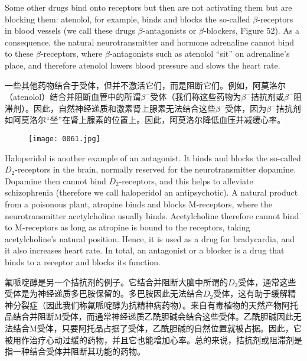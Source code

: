 \documentclass[dvipsnames, svgnames,a4paper,11pt]{article}
\begin{document}
Some other drugs bind onto receptors but then are not activating them but are blocking them: atenolol, for example, binds and blocks the so-called $\beta$-receptors in blood vessels (we call these drugs $\beta$-antagonists or $\beta$-blockers, Figure 52). As a consequence, the natural neurotransmitter and hormone adrenaline cannot bind to these $\beta$-receptors, where $\beta$-antagonists such as atenolol “sit” on adrenaline’s place, and therefore atenolol lowers blood pressure and slows the heart rate.  

一些其他药物结合于受体，但并不激活它们，而是阻断它们。例如，阿莫洛尔（atenolol）结合并阻断血管中的所谓$\beta^{-}$受体（我们称这些药物为$\beta^{-}$拮抗剂或$\beta^{-}$阻滞剂）。因此，自然神经递质和激素肾上腺素无法结合这些$\beta^{-}$受体，因为$\beta^{-}$拮抗剂如阿莫洛尔“坐”在肾上腺素的位置上。因此，阿莫洛尔降低血压并减缓心率。

\begin{figure}[ht]
    \centering
    \texttt{[image: 0061.jpg]}
     \label{fig52B}
\end{figure}

Haloperidol is another example of an antagonist. It binds and blocks the so-called $D_2$-receptors in the brain, normally reserved for the neurotransmitter dopamine. Dopamine then cannot bind $D_2$-receptors, and this helps to alleviate schizophrenia (therefore we call haloperidol an antipsychotic). A natural product from a poisonous plant, atropine binds and blocks M-receptors, where the neurotransmitter acetylcholine usually binds. Acetylcholine therefore cannot bind to M-receptors as long as atropine is bound to the receptors, taking acetylcholine’s natural position. Hence, it is used as a drug for bradycardia, and it also increases heart rate. In total, an antagonist or a blocker is a drug that binds to a receptor and blocks its function.

氟哌啶醇是另一个拮抗剂的例子。它结合并阻断大脑中所谓的$D_2$受体，通常这些受体是为神经递质多巴胺保留的。多巴胺因此无法结合$D_2$受体，这有助于缓解精神分裂症（因此我们称氟哌啶醇为抗精神病药物）。来自有毒植物的天然产物阿托品结合并阻断M受体，而通常神经递质乙酰胆碱会结合这些受体。乙酰胆碱因此无法结合M受体，只要阿托品占据了受体，乙酰胆碱的自然位置就被占据。因此，它被用作治疗心动过缓的药物，并且它也能增加心率。总的来说，拮抗剂或阻滞剂是指一种结合受体并阻断其功能的药物。
\end{document}
